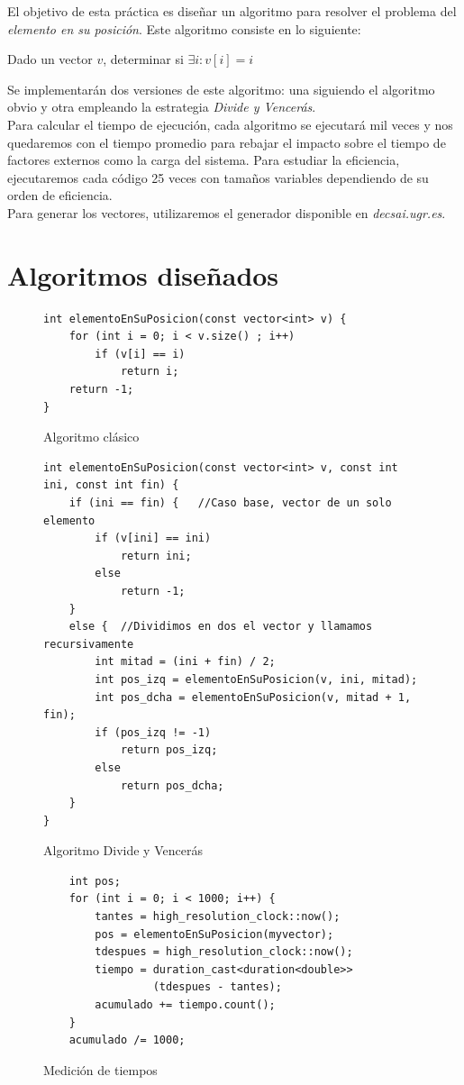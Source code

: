 \documentclass[12pt,spanish]{article}
\begin{document}
El objetivo de esta práctica es diseñar un algoritmo para resolver el problema del \textit{elemento en su posición}. Este algoritmo consiste en lo siguiente:
\begin{center}
Dado un vector $v$, determinar si $\exists i : v[i]=i $
\end{center}
Se implementarán dos versiones de este algoritmo: una siguiendo el algoritmo obvio y otra empleando la estrategia \emph{Divide y Vencerás}. \\

Para calcular el tiempo de ejecución, cada algoritmo se ejecutará mil veces y nos quedaremos con el tiempo promedio para rebajar el impacto sobre el tiempo de factores externos como la carga del sistema. Para estudiar la eficiencia, ejecutaremos cada código 25 veces con tamaños variables dependiendo de su orden de eficiencia. \\
Para generar los vectores, utilizaremos el generador disponible en \textit{decsai.ugr.es}.

\section{Algoritmos diseñados}

\begin{figure}[H]
\begin{verbatim}
int elementoEnSuPosicion(const vector<int> v) {
	for (int i = 0; i < v.size() ; i++)
		if (v[i] == i)
			return i;
	return -1;
}
\end{verbatim}
\caption{Algoritmo clásico}
\label{alg:clasico}
\end{figure}

\begin{figure}[H]
\begin{verbatim}
int elementoEnSuPosicion(const vector<int> v, const int ini, const int fin) {
	if (ini == fin) {	//Caso base, vector de un solo elemento
		if (v[ini] == ini)
			return ini;
		else
			return -1;
	}
	else {	//Dividimos en dos el vector y llamamos recursivamente
		int mitad = (ini + fin) / 2;
		int pos_izq = elementoEnSuPosicion(v, ini, mitad);
		int pos_dcha = elementoEnSuPosicion(v, mitad + 1, fin);
		if (pos_izq != -1)
			return pos_izq;
		else
			return pos_dcha;
	}
}	
\end{verbatim}
\caption{Algoritmo Divide y Vencerás}
\label{alg:dyv}
\end{figure}

\begin{figure}[H]
\begin{verbatim}
	int pos;
	for (int i = 0; i < 1000; i++) {
		tantes = high_resolution_clock::now();
		pos = elementoEnSuPosicion(myvector);
		tdespues = high_resolution_clock::now();
		tiempo = duration_cast<duration<double>>
		         (tdespues - tantes);
		acumulado += tiempo.count();
	}
	acumulado /= 1000;
\end{verbatim}
\caption{Medición de tiempos}
\end{figure}
\end{document}
